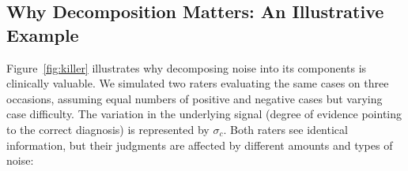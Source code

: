 \subsection*{Why Decomposition Matters: An Illustrative Example}

Figure~\ref{fig:killer} illustrates why decomposing noise into its components is clinically valuable. We simulated two raters evaluating the same cases on three occasions, assuming equal numbers of positive and negative cases but varying case difficulty. The variation in the underlying signal (degree of evidence pointing to the correct diagnosis) is represented by $\sigma_c$. Both raters see identical information, but their judgments are affected by different amounts and types of noise:

\beg







